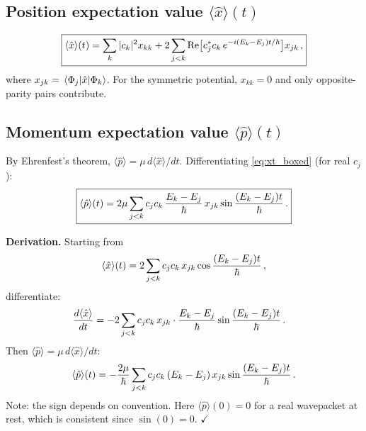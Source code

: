 \subsection{Position expectation value $\langle\hat{x}\rangle(t)$}

\begin{equation}\label{eq:xt_boxed}
  \boxed{\langle\hat{x}\rangle(t) = \sum_k |c_k|^2 x_{kk}
  + 2\sum_{j<k}\text{Re}\bigl[c_j^*c_k\,e^{-i(E_k-E_j)t/\hbar}\bigr]x_{jk}\,,}
\end{equation}
where $x_{jk} = \mel{\Phi_j}{\hat{x}}{\Phi_k}$.
For the symmetric potential, $x_{kk} = 0$ and only opposite-parity pairs contribute.

\subsection{Momentum expectation value $\langle\hat{p}\rangle(t)$}

By Ehrenfest's theorem, $\langle\hat{p}\rangle = \mu\,d\langle\hat{x}\rangle/dt$.
Differentiating \cref{eq:xt_boxed} (for real $c_j$):
\begin{equation}
  \boxed{\langle\hat{p}\rangle(t) = 2\mu\sum_{j<k}c_j c_k\,\frac{E_k-E_j}{\hbar}\,x_{jk}\sin\frac{(E_k-E_j)t}{\hbar}\,.}
\end{equation}

\textbf{Derivation.} Starting from
\begin{equation}
  \langle\hat{x}\rangle(t) = 2\sum_{j<k}c_jc_k\,x_{jk}\cos\frac{(E_k-E_j)t}{\hbar}\,,
\end{equation}
differentiate:
\begin{align}
  \frac{d\langle\hat{x}\rangle}{dt}
  &= -2\sum_{j<k}c_jc_k\,x_{jk}\cdot\frac{E_k-E_j}{\hbar}\sin\frac{(E_k-E_j)t}{\hbar}\,.
\end{align}
Then $\langle\hat{p}\rangle = \mu\,d\langle\hat{x}\rangle/dt$:
\begin{equation}
  \langle\hat{p}\rangle(t) = -\frac{2\mu}{\hbar}\sum_{j<k}c_jc_k\,(E_k-E_j)\,x_{jk}\sin\frac{(E_k-E_j)t}{\hbar}\,.
\end{equation}
Note: the sign depends on convention. Here $\langle\hat{p}\rangle(0) = 0$ for a
real wavepacket at rest, which is consistent since $\sin(0) = 0$. $\checkmark$

